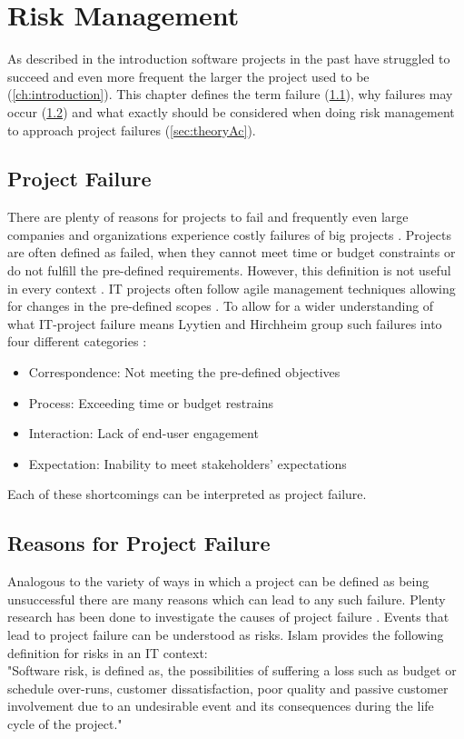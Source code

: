 \section{Risk Management}
\label{sec:theoryA}

As described in the introduction software projects in the past have struggled to succeed and even more frequent the larger the project used to be (\ref{ch:introduction}). This chapter defines the term failure (\ref{sec:theorAa}), why failures may occur (\ref{sec:theorAb}) and what exactly should be considered when doing risk management to approach project failures (\ref{sec:theoryAc}).

\subsection{Project Failure}
\label{sec:theorAa}
There are plenty of reasons for projects to fail and frequently even large companies and organizations experience costly failures of big projects \cite{dwivediResearchInformationSystems2015}. Projects are often defined as failed, when they cannot meet time or budget constraints or do not fulfill the pre-defined requirements. However, this definition is not useful in every context \cite{debakkerDoesRiskManagement2010}. IT projects often follow agile management techniques allowing for changes in the pre-defined scopes \cite{kusay-merkleAgilesProjektmanagementIm2018}. To allow for a wider understanding of what IT-project failure means Lyytien and Hirchheim group such failures into four different categories \cite{lyytinenInformationSystemsFailures1988}: 
\begin{itemize}
	\item Correspondence: Not meeting the pre-defined objectives
	\item Process: Exceeding time or budget restrains
	\item Interaction: Lack of end-user engagement
	\item Expectation: Inability to meet stakeholders' expectations
\end{itemize}
Each of these shortcomings can be interpreted as project failure.

\subsection{Reasons for Project Failure}
\label{sec:theorAb}	
Analogous to the variety of ways in which a project can be defined as being unsuccessful there are many reasons which can lead to any such failure. Plenty research has been done to investigate the causes of project failure \cite{guptaSystematicLiteratureReview2018}.  Events that lead to project failure can be understood as risks. Islam \cite{islamSoftwareDevelopmentRisk2011} provides the following definition for risks in an IT context:\\
"Software risk, is defined as, the possibilities of suffering a loss such as budget or schedule over-runs, customer dissatisfaction, poor quality and passive customer involvement due to an undesirable event and its consequences during the life cycle of the project."

